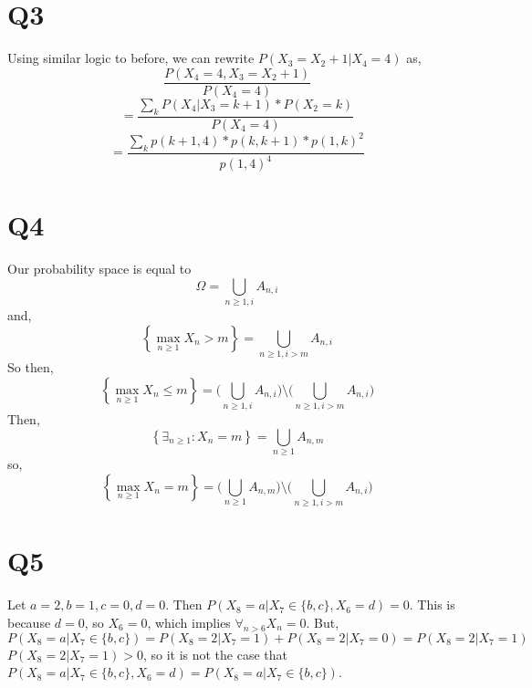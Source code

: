 \documentclass{article}
\begin{document}
\section*{Q3}
Using similar logic to before, we can rewrite $P(X_3 = X_2 + 1 | X_4 = 4)$ as,
\[
\frac{P(X_4 = 4 , X_3 = X_2 + 1)}{P(X_4 = 4)}
\]
\[
= \frac{\sum_k P(X_4 | X_3 = k +1)*P(X_2 = k)}{P(X_4 = 4)}
\]
\[
=\frac{\sum_k p(k+1,4) * p(k,k+1)*p(1,k)^2}{p(1,4)^4}
\]

\section*{Q4}
Our probability space is equal to 
\[
\Omega = \bigcup_{n \geq 1 ,i} A_{n,i}
\]
and, 
\[
\left\{\max_{n \geq 1} X_n > m \right\}  = \bigcup_{n \geq 1, i > m} A_{n,i}
\]
So then, 
\[
\left\{\max_{n \geq 1} X_n \leq m \right\}  =  \bigg( \bigcup_{n \geq 1 ,i} A_{n,i} \bigg) \setminus \bigg( \bigcup_{n \geq 1, i > m} A_{n,i} \bigg)
\]
Then,
\[
\left\{ \exists_{n \geq 1} : X_n = m \right\} = \bigcup_{n \geq 1} A_{n,m}
\]
so,
\[
\left\{\max_{n \geq 1} X_n = m \right\}  = \bigg( \bigcup_{n \geq 1} A_{n,m} \bigg) \setminus \bigg( \bigcup_{n \geq 1 , i > m} A_{n,i} \bigg)
\]

\section*{Q5}
Let $a = 2, b = 1, c = 0, d = 0$. Then $P(X_8 = a | X_7 \in \{b,c\} , X_6 = d) = 0$. This is because $d = 0$, so $X_6 = 0$, which implies $\forall_{n > 6} X_n = 0$.
But, 
\[
P(X_8 = a| X_7 \in \{b,c\}) = P(X_8 = 2 | X_7 = 1) + P(X_8 = 2 | X_7 = 0) = P(X_8 = 2 | X_7 = 1)
\]
$P(X_8 = 2 | X_7 = 1) > 0$, so it is not the case that 
\\
$P(X_8 = a | X_7 \in \{b,c\} , X_6 = d) = P(X_8 = a| X_7 \in \{b,c\})$.
\end{document}
